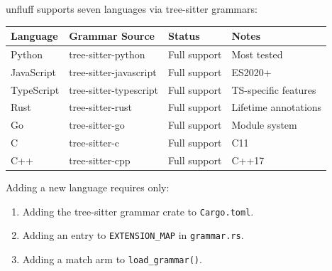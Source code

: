 \documentclass[
  letterpaper,
]{article}
\newcounter{none} %
\providecommand{\tightlist}{%
  \setlength{\itemsep}{0pt}\setlength{\parskip}{0pt}}
\begin{document}
unfluff supports seven languages via tree-sitter grammars:

{\def\LTcaptype{none} %
\begin{longtable}[]{@{}
  >{\raggedright\arraybackslash}p{}
  >{\raggedright\arraybackslash}p{}
  >{\raggedright\arraybackslash}p{}
  >{\raggedright\arraybackslash}p{}@{}}
\toprule\noalign{}
\begin{minipage}[b]{\linewidth}\raggedright
Language
\end{minipage} & \begin{minipage}[b]{\linewidth}\raggedright
Grammar Source
\end{minipage} & \begin{minipage}[b]{\linewidth}\raggedright
Status
\end{minipage} & \begin{minipage}[b]{\linewidth}\raggedright
Notes
\end{minipage} \\
\midrule\noalign{}
\endhead
\bottomrule\noalign{}
\endlastfoot
Python & tree-sitter-python & Full support & Most tested \\
JavaScript & tree-sitter-javascript & Full support & ES2020+ \\
TypeScript & tree-sitter-typescript & Full support & TS-specific
features \\
Rust & tree-sitter-rust & Full support & Lifetime annotations \\
Go & tree-sitter-go & Full support & Module system \\
C & tree-sitter-c & Full support & C11 \\
C++ & tree-sitter-cpp & Full support & C++17 \\
\end{longtable}
}

Adding a new language requires only:

\begin{enumerate}
\def\labelenumi{\arabic{enumi}.}
\tightlist
\item
  Adding the tree-sitter grammar crate to \texttt{Cargo.toml}.
\item
  Adding an entry to \texttt{EXTENSION\_MAP} in \texttt{grammar.rs}.
\item
  Adding a match arm to \texttt{load\_grammar()}.
\end{enumerate}
\end{document}
